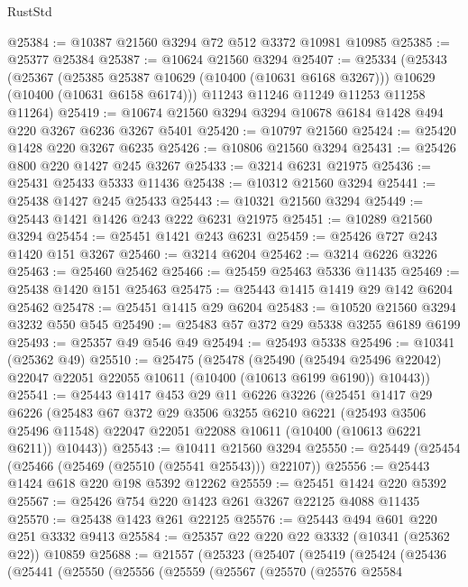 \begin{lexlean}{RustStd}
\begin{coremodule}
@25384 := @10387 @21560 @3294 @72 @512 @3372 @10981 @10985
@25385 := @25377 @25384
@25387 := @10624 @21560 @3294
@25407 := @25334
    (@25343
      (@25367
        (@25385 @25387 @10629 (@10400 (@10631 @6168 @3267)))
        @10629
        (@10400 (@10631 @6158 @6174)))
      @11243
      @11246
      @11249
      @11253
      @11258
      @11264)
@25419 := @10674 @21560 @3294 @3294 @10678 @6184 @1428 @494 @220 @3267 @6236 @3267 @5401
@25420 := @10797 @21560
@25424 := @25420 @1428 @220 @3267 @6235
@25426 := @10806 @21560 @3294
@25431 := @25426 @800 @220 @1427 @245 @3267
@25433 := @3214 @6231 @21975
@25436 := @25431 @25433 @5333 @11436
@25438 := @10312 @21560 @3294
@25441 := @25438 @1427 @245 @25433
@25443 := @10321 @21560 @3294
@25449 := @25443 @1421 @1426 @243 @222 @6231 @21975
@25451 := @10289 @21560 @3294
@25454 := @25451 @1421 @243 @6231
@25459 := @25426 @727 @243 @1420 @151 @3267
@25460 := @3214 @6204
@25462 := @3214 @6226 @3226
@25463 := @25460 @25462
@25466 := @25459 @25463 @5336 @11435
@25469 := @25438 @1420 @151 @25463
@25475 := @25443 @1415 @1419 @29 @142 @6204 @25462
@25478 := @25451 @1415 @29 @6204
@25483 := @10520 @21560 @3294 @3232 @550 @545
@25490 := @25483 @57 @372 @29 @5338 @3255 @6189 @6199
@25493 := @25357 @49 @546 @49
@25494 := @25493 @5338
@25496 := @10341 (@25362 @49)
@25510 := @25475
    (@25478
      (@25490
        (@25494 @25496 @22042)
        @22047
        @22051
        @22055
        @10611
        (@10400 (@10613 @6199 @6190))
        @10443))
@25541 := @25443
    @1417
    @453
    @29
    @11
    @6226
    @3226
    (@25451
      @1417
      @29
      @6226
      (@25483
        @67
        @372
        @29
        @3506
        @3255
        @6210
        @6221
        (@25493 @3506 @25496 @11548)
        @22047
        @22051
        @22088
        @10611
        (@10400 (@10613 @6221 @6211))
        @10443))
@25543 := @10411 @21560 @3294
@25550 := @25449 (@25454 (@25466 (@25469 (@25510 (@25541 @25543))) @22107))
@25556 := @25443 @1424 @618 @220 @198 @5392 @12262
@25559 := @25451 @1424 @220 @5392
@25567 := @25426 @754 @220 @1423 @261 @3267 @22125 @4088 @11435
@25570 := @25438 @1423 @261 @22125
@25576 := @25443 @494 @601 @220 @251 @3332 @9413
@25584 := @25357 @22 @220 @22 @3332 (@10341 (@25362 @22)) @10859
@25688 := @21557
    (@25323
      (@25407
        (@25419
          (@25424
            (@25436
              (@25441
                (@25550
                  (@25556
                    (@25559
                      (@25567
                        (@25570
                          (@25576
                            @25584

\end{coremodule}
\end{lexlean}
